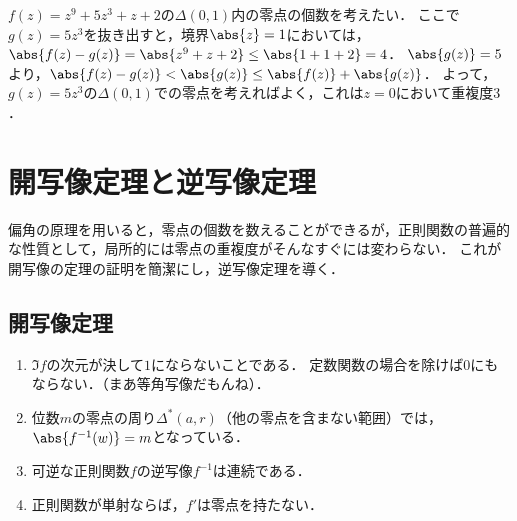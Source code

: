 \documentclass[uplatex, dvipdfmx]{jsreport}
\begin{document}
\begin{example}
    $f(z)=z^9+5z^3+z+2$の$\Delta(0,1)$内の零点の個数を考えたい．
    ここで$g(z)=5z^3$を抜き出すと，境界$\abs{z}=1$においては，$\abs{f(z)-g(z)}=\abs{z^9+z+2}\le\abs{1+1+2}=4$．
    $\abs{g(z)}=5$より，$\abs{f(z)-g(z)}<\abs{g(z)}\le\abs{f(z)}+\abs{g(z)}$．
    よって，$g(z)=5z^3$の$\Delta(0,1)$での零点を考えればよく，これは$z=0$において重複度$3$．
\end{example}

\section{開写像定理と逆写像定理}

\begin{tcolorbox}[colframe=ForestGreen, colback=ForestGreen!10!white,breakable,colbacktitle=ForestGreen!40!white,coltitle=black,fonttitle=\bfseries\sffamily,
title=偏角の原理が拓いた道]
    偏角の原理を用いると，零点の個数を数えることができるが，正則関数の普遍的な性質として，局所的には零点の重複度がそんなすぐには変わらない．
    これが開写像の定理の証明を簡潔にし，逆写像定理を導く．
\end{tcolorbox}

\subsection{開写像定理}

\begin{tcolorbox}[colframe=ForestGreen, colback=ForestGreen!10!white,breakable,colbacktitle=ForestGreen!40!white,coltitle=black,fonttitle=\bfseries\sffamily,
title=開写像定理の重要な含意]
    \begin{enumerate}
        \item $\Im f$の次元が決して$1$にならないことである．
        定数関数の場合を除けば$0$にもならない．（まあ等角写像だもんね）．
        \item 位数$m$の零点の周り$\Delta^*(a,r)$（他の零点を含まない範囲）では，$\abs{f^{-1}(w)}=m$となっている．
        \item 可逆な正則関数$f$の逆写像$f^{-1}$は連続である．
        \item 正則関数が単射ならば，$f'$は零点を持たない．
    \end{enumerate}
\end{tcolorbox}
\end{document}
